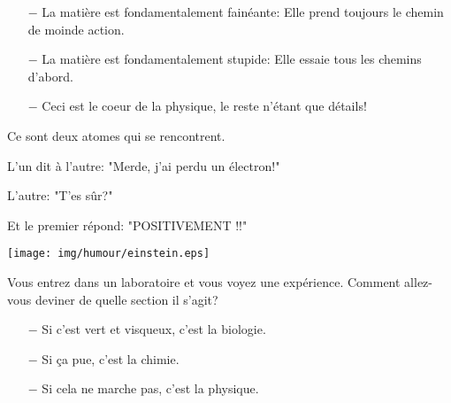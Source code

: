 	\begin{center}\underline{\hspace{5 cm}}\end{center}
	
	\begin{itemize}	 
		\item[$-$]  La matière est fondamentalement fainéante: Elle prend toujours le chemin de moinde action.
	
		\item[$-$] La matière est fondamentalement stupide: Elle essaie tous les chemins d'abord.
		
		\item[$-$] Ceci est le coeur de la physique, le reste n'étant que détails!
	\end{itemize}
	
	\begin{center}\underline{\hspace{5 cm}}\end{center}
	
	Ce sont deux atomes qui se rencontrent.  

	L'un dit à l'autre: "Merde, j'ai perdu un électron!"

	L'autre: "T'es sûr?"

	Et le premier répond: "POSITIVEMENT !!"
	
	\begin{center}\underline{\hspace{5 cm}}\end{center}

	\begin{center}
	\texttt{[image: img/humour/einstein.eps]}
	\end{center}
	
	\begin{center}\underline{\hspace{5 cm}}\end{center}	
	
	Vous entrez dans un laboratoire et vous voyez une expérience. Comment allez-vous deviner de quelle section il s'agit?
	
	\begin{itemize}	 
		\item[$-$] Si c'est vert et visqueux, c'est la biologie.
	
		\item[$-$] Si ça pue, c'est la chimie.
	
		\item[$-$] Si cela ne marche pas, c'est la physique.
	\end{itemize}
	

